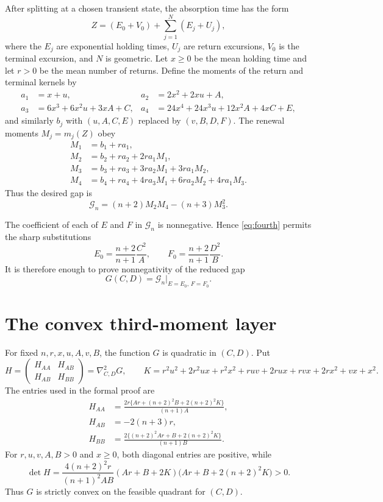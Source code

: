 \documentclass[11pt]{article}
\newcommand{\Gap}{\mathcal G}
\begin{document}
After splitting at a chosen transient state, the absorption time has the form
\[
 Z=(E_0+V_0)+\sum_{j=1}^{N}(E_j+U_j),
\]
where the $E_j$ are exponential holding times, $U_j$ are return excursions,
$V_0$ is the terminal excursion, and $N$ is geometric.  Let $x\ge0$ be the
mean holding time and let $r>0$ be the mean number of returns.  Define the
moments of the return and terminal kernels by
\begin{align*}
 a_1&=x+u,
 &a_2&=2x^2+2xu+A,\\
 a_3&=6x^3+6x^2u+3xA+C,
 &a_4&=24x^4+24x^3u+12x^2A+4xC+E,
\end{align*}
and similarly $b_j$ with $(u,A,C,E)$ replaced by $(v,B,D,F)$.
The renewal moments $M_j=m_j(Z)$ obey
\begin{align}
 M_1&=b_1+ra_1,\nonumber\\
 M_2&=b_2+ra_2+2ra_1M_1,\nonumber\\
 M_3&=b_3+ra_3+3ra_2M_1+3ra_1M_2,\label{eq:renewal}\\
 M_4&=b_4+ra_4+4ra_3M_1+6ra_2M_2+4ra_1M_3.\nonumber
\end{align}
Thus the desired gap is
\[
 \Gap_n=(n+2)M_2M_4-(n+3)M_3^2.
\]

The coefficient of each of $E$ and $F$ in $\Gap_n$ is nonnegative.  Hence
\eqref{eq:fourth} permits the sharp substitutions
\begin{equation}\label{eq:lower-fourth}
 E_0=\frac{n+2}{n+1}\frac{C^2}{A},\qquad
 F_0=\frac{n+2}{n+1}\frac{D^2}{B}.
\end{equation}
It is therefore enough to prove nonnegativity of the reduced gap
\[
 G(C,D)=\Gap_n\big|_{E=E_0,\,F=F_0}.
\]

\section{The convex third-moment layer}

For fixed $n,r,x,u,A,v,B$, the function $G$ is quadratic in $(C,D)$.  Put
\[
 H=\begin{pmatrix}H_{AA}&H_{AB}\\ H_{AB}&H_{BB}\end{pmatrix}
       =\nabla^2_{C,D}G,
 \qquad K=r^2u^2+2r^2ux+r^2x^2+ruv+2rux+rvx+2rx^2+vx+x^2.
\]
The entries used in the formal proof are
\begin{align*}
 H_{AA}&=\frac{2r\{Ar+(n+2)^2B+2(n+2)^2K\}}{(n+1)A},\\
 H_{AB}&=-2(n+3)r,\\
 H_{BB}&=\frac{2\{(n+2)^2Ar+B+2(n+2)^2K\}}{(n+1)B}.
\end{align*}
For $r,u,v,A,B>0$ and $x\ge0$, both diagonal entries are positive, while
\begin{equation}\label{eq:hessian-det}
 \det H=
 \frac{4(n+2)^2r}{(n+1)^2AB}
 (Ar+B+2K)\bigl(Ar+B+2(n+2)^2K\bigr)>0.
\end{equation}
Thus $G$ is strictly convex on the feasible quadrant for $(C,D)$.
\end{document}
